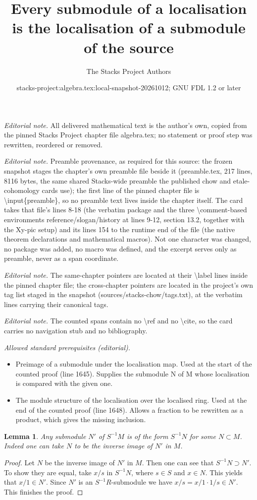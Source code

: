 \documentclass[10pt,a4paper]{amsart}
\title{Every submodule of a localisation is the localisation of a submodule of the source}
\author{The Stacks Project Authors}
\date{stacks-project:algebra.tex:local-snapshot-20261012; GNU FDL 1.2 or later}
\theoremstyle{plain}
\newtheorem{lemma}[subsection]{Lemma}
\theoremstyle{definition}
\theoremstyle{remark}
\numberwithin{equation}{subsection}
\begin{document}
\maketitle
\noindent\textit{Editorial note.} All delivered mathematical text is the author's own, copied from the pinned Stacks Project chapter file algebra.tex; no statement or proof step was rewritten, reordered or removed.\par\medskip
\noindent\textit{Editorial note.} Preamble provenance, as required for this source: the frozen snapshot stages the chapter's own preamble file beside it (preamble.tex, 217 lines, 8116 bytes, the same shared Stacks-wide preamble the published chow and etale-cohomology cards use); the first line of the pinned chapter file is \textbackslash{}input\{preamble\}, so no preamble text lives inside the chapter itself. The card takes that file's lines 8-18 (the verbatim package and the three \textbackslash{}comment-based environments reference/slogan/history at lines 9-12, section 13.2, together with the Xy-pic setup) and its lines 154 to the runtime end of the file (the native theorem declarations and mathematical macros). Not one character was changed, no package was added, no macro was defined, and the excerpt serves only as preamble, never as a span coordinate.\par\medskip
\noindent\textit{Editorial note.} The same-chapter pointers are located at their \textbackslash{}label lines inside the pinned chapter file; the cross-chapter pointers are located in the project's own tag list staged in the snapshot (sources/stacks-chow/tags.txt), at the verbatim lines carrying their canonical tags.\par\medskip
\noindent\textit{Editorial note.} The counted spans contain no \textbackslash{}ref and no \textbackslash{}cite, so the card carries no navigation stub and no bibliography.\par\medskip
\noindent\textit{Allowed standard prerequisites (editorial).}\begin{itemize}
\item Preimage of a submodule under the localisation map. Used at the start of the counted proof (line 1645). Supplies the submodule N of M whose localisation is compared with the given one.
\item The module structure of the localisation over the localised ring. Used at the end of the counted proof (line 1648). Allows a fraction to be rewritten as a product, which gives the missing inclusion.
\end{itemize}\medskip
\begin{lemma}
\label{lemma-submodule-localization}
Any submodule $N'$ of $S^{-1}M$ is of the form $S^{-1}N$ for some
$N\subset M$. Indeed one can take $N$ to be the inverse image of
$N'$ in $M$.
\end{lemma}

\begin{proof}
Let $N$ be the inverse image of $N'$ in $M$. Then one can see that
$S^{-1}N\supset N'$. To show they are equal, take $x/s$ in
$S^{-1}N$, where $s\in S$ and $x\in N$. This yields that $x/1\in
N'$. Since $N'$ is an $S^{-1}R$-submodule we have
$x/s = x/1\cdot 1/s\in N'$. This finishes the proof.
\end{proof}
\end{document}
